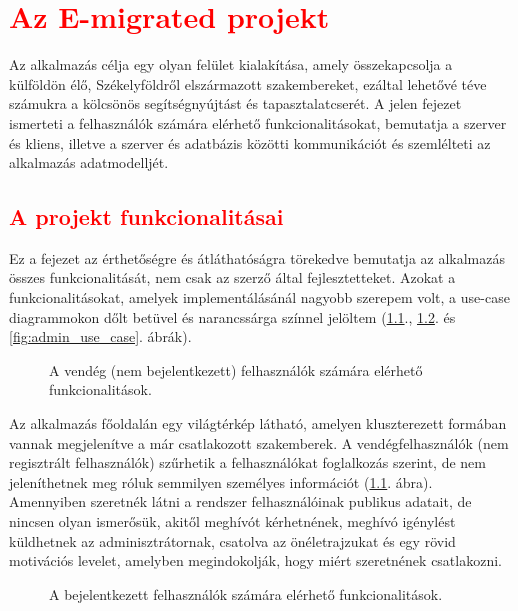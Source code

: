 \chapter{\textcolor{red}{Az E-migrated projekt}}\label{ch:projektrol}

\begin{osszefoglal}
Az alkalmazás célja egy olyan felület kialakítása, amely összekapcsolja a külföldön élő, Székelyföldről elszármazott szakembereket, ezáltal lehetővé téve számukra a kölcsönös segítségnyújtást és tapasztalatcserét. A jelen fejezet ismerteti a felhasználók számára elérhető funkcionalitásokat, bemutatja a szerver és kliens, illetve a szerver és adatbázis közötti kommunikációt és szemlélteti az alkalmazás adatmodelljét.
\end{osszefoglal}

\section{\textcolor{red}{A projekt funkcionalitásai}}\label{sec:projektrol:funkcionalitasok}

Ez a fejezet az érthetőségre és átláthatóságra törekedve bemutatja az alkalmazás összes funkcionalitását, nem csak az szerző által fejlesztetteket. Azokat a funkcionalitásokat, amelyek implementálásánál nagyobb szerepem volt, a use-case diagrammokon dőlt betüvel és narancssárga színnel jelöltem (\ref{fig:vendeg_use_case}., \ref{fig:felhasznalo_user_case}. és \ref{fig:admin_use_case}. ábrák). 

\begin{figure}
  \centering
  \caption{A vendég (nem bejelentkezett) felhasználók számára elérhető funkcionalitások.}
  \label{fig:vendeg_use_case}
\end{figure}
Az alkalmazás főoldalán egy világtérkép  látható, amelyen kluszterezett formában vannak megjelenítve a már csatlakozott szakemberek. A vendégfelhasználók (nem regisztrált felhasználók) szűrhetik a felhasználókat foglalkozás szerint, de nem jeleníthetnek meg róluk semmilyen személyes információt (\ref{fig:vendeg_use_case}. ábra). Amennyiben szeretnék látni a rendszer felhasználóinak publikus adatait, de nincsen olyan ismerősük, akitől meghívót kérhetnének, meghívó igénylést küldhetnek az adminisztrátornak, csatolva az önéletrajzukat és egy rövid motivációs levelet, amelyben megindokolják, hogy miért szeretnének csatlakozni.

\begin{figure}
  \centering
  \caption{A bejelentkezett felhasználók számára elérhető funkcionalitások.}
  \label{fig:felhasznalo_user_case}
\end{figure}

